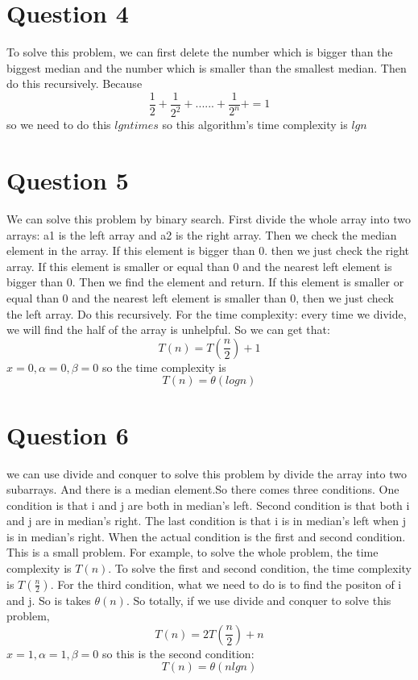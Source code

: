 \documentclass[paper=a4, fontsize=11pt]{scrartcl} %
\numberwithin{equation}{section} %
\numberwithin{figure}{section} %
\numberwithin{table}{section} %
\begin{document}
\vspace{2cm}
\section{Question 4}
To solve this problem, we can first delete the number which is bigger than the biggest median and the number which is smaller than the smallest median. Then do this recursively. Because 
$$\frac{1}{2}+\frac{1}{2^2}+......+\frac{1}{2^n}+ =1$$
so we need to do this $lgn times$
so this algorithm's time complexity is $lgn$

\vspace{2cm}
\section{Question 5}
We can solve this problem by binary search. First divide the whole array into two arrays: a1 is the left array and a2 is the right array. Then we check the median element in the array. If this element is bigger than 0. then we just check the right array. If this element is smaller or equal than 0 and the nearest left element is bigger than 0. Then we find  the element and return. If this element is smaller or equal than 0 and the nearest left element is smaller than 0, then we just check the left array. Do this recursively.
For the time complexity: every time we divide, we will find the half of the array is unhelpful. 
So we can get that:
$$ T(n)=T(\frac{n}{2})+1$$
$x=0, \alpha=0, \beta=0$
so the time complexity is
$$T(n)=\theta{(log n)}$$

\vspace{2cm}
\section{Question 6}
we can use divide and conquer to solve this problem by divide the array into two subarrays. And there is a median element.So there comes three conditions. One condition is that i and j are both in median's left. Second condition is that both i and j are in median's right. The last condition is that i is in median's left when j is in median's right. When the actual condition is the first and second condition. This is a small problem. For example, to solve the whole problem, the time complexity is $T(n)$. To solve the first and second condition, the time complexity is $T(\frac{n}{2})$. For the third condition, what we need to do is to find the positon of i and j. So is takes $\theta(n)$.
So totally, if we use divide and conquer to solve this problem, 
$$T(n)=2T(\frac{n}{2})+n$$
$x=1, \alpha=1, \beta=0$
so this is the second condition:
$$T(n)=\theta{(nlgn)}$$
\end{document}

